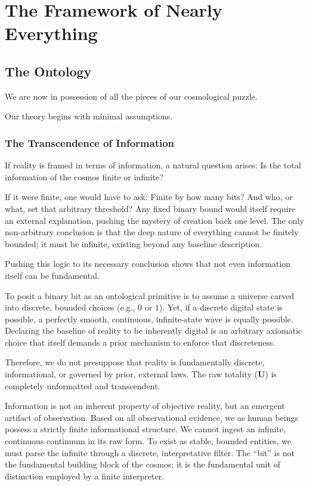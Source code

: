 \chapter{The Framework of Nearly Everything}
\label{chap:framework-of-everything}

\section{The Ontology}

We are now in possession of all the pieces of our cosmological puzzle.

Our theory begins with minimal assumptions.

\subsection*{The Transcendence of Information}

If reality is framed in terms of information, a natural question arises: Is the total information of the cosmos finite or infinite?

If it were finite, one would have to ask: Finite by how many bits? And who, or what, set that arbitrary threshold?
Any fixed binary bound would itself require an external explanation, pushing the mystery of creation back one level.
The only non-arbitrary conclusion is that the deep nature of everything cannot be finitely bounded; it must be infinite, existing beyond any baseline description.

Pushing this logic to its necessary conclusion shows that not even information itself can be fundamental. 

To posit a binary bit as an ontological primitive is to assume a universe carved into discrete, bounded choices (e.g., $0$ or $1$).
Yet, if a discrete digital state is possible, a perfectly smooth, continuous, infinite-state wave is equally possible.
Declaring the baseline of reality to be inherently digital is an arbitrary axiomatic choice that itself demands a prior mechanism to enforce that discreteness. 

Therefore, we do not presuppose that reality is fundamentally discrete, informational, or governed by prior, external laws.
The raw totality ($\mathbf{U}$) is completely unformatted and transcendent. 

Information is not an inherent property of objective reality, but an emergent artifact of observation.
Based on all observational evidence, we as human beings possess a strictly finite informational structure.
We cannot ingest an infinite, continuous continuum in its raw form.
To exist as stable, bounded entities, we must parse the infinite through a discrete, interpretative filter.
The ``bit'' is not the fundamental building block of the cosmos; it is the fundamental unit of distinction employed by a finite interpreter.

